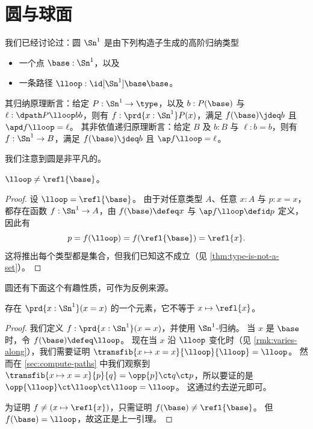 %

\section{圆与球面}
\label{sec:circle}

%
我们已经讨论过：圆 $\Sn^1$ 是由下列构造子生成的高阶归纳类型
\begin{itemize}
\item 一个点 $\base:\Sn^1$，以及
\item 一条路径 $\lloop : {\id[\Sn^1]\base\base}$。
\end{itemize}
%
其归纳原理断言：给定 $P:\Sn^1\to\type$，以及 $b:P(\base)$ 与 $\ell :\dpath P \lloop b b$，则有 $f:\prd{x:\Sn^1} P(x)$，满足 $f(\base)\jdeq b$ 且 $\apd f \lloop = \ell$。
其非依值递归原理断言：给定 $B$ 及 $b:B$ 与 $\ell:b=b$，则有 $f:\Sn^1\to B$，满足 $f(\base)\jdeq b$ 且 $\ap f \lloop = \ell$。

我们注意到圆是非平凡的。

\begin{lem}\label{thm:loop-nontrivial}
  $\lloop\neq\refl{\base}$。
\end{lem}
\begin{proof}
  设 $\lloop=\refl{\base}$。
  由于对任意类型 $A$、任意 $x:A$ 与 $p:x=x$，都存在函数 $f:\Sn^1\to A$，由 $f(\base)\defeq x$ 与 $\ap f \lloop \defid p$ 定义，因此有
  \[p = f(\lloop) = f(\refl{\base}) = \refl{x}.\]
  这将推出每个类型都是集合，但我们已知这不成立（见 \cref{thm:type-is-not-a-set}）。
\end{proof}

圆还有下面这个有趣性质，可作为反例来源。

\begin{lem}\label{thm:S1-autohtpy}
  存在 $\prd{x:\Sn^1} (x=x)$ 的一个元素，它不等于 $x\mapsto \refl{x}$。
\end{lem}
\begin{proof}
  我们定义 $f:\prd{x:\Sn^1} (x=x)$，并使用 $\Sn^1$-归纳。
  当 $x$ 是 $\base$ 时，令 $f(\base)\defeq \lloop$。
  现在当 $x$ 沿 $\lloop$ 变化时（见 \cref{rmk:varies-along}），我们需要证明 $\transfib{x\mapsto x=x}{\lloop}{\lloop} = \lloop$。
  然而在 \cref{sec:compute-paths} 中我们观察到 $\transfib{x\mapsto x=x}{p}{q} = \opp{p} \ct q \ct p$，所以要证的是 $\opp{\lloop} \ct \lloop \ct \lloop = \lloop$。
  这通过约去逆元即可。

  为证明 $f\neq (x\mapsto \refl{x})$，只需证明 $f(\base) \neq \refl{\base}$。
  但 $f(\base)=\lloop$，故这正是上一引理。
\end{proof}


